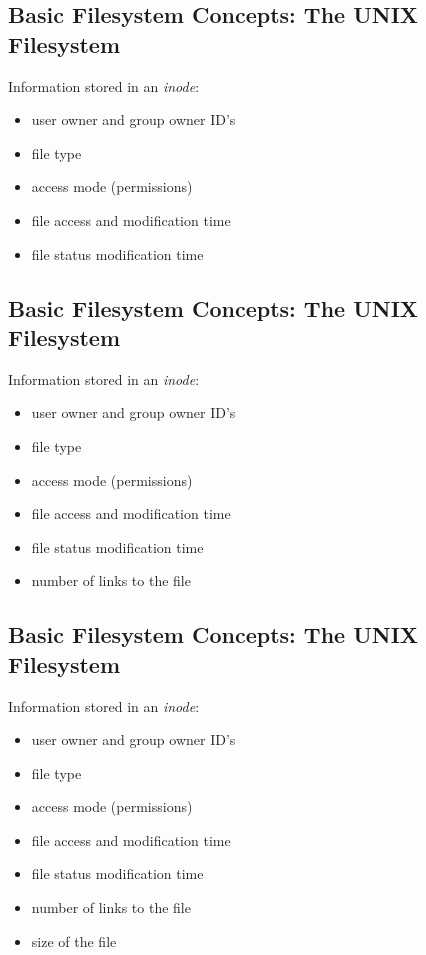 \documentclass[xga]{xdvislides}
\begin{document}
\subsection{Basic Filesystem Concepts: The UNIX Filesystem}
Information stored in an {\em inode}:
\begin{itemize}
	\item user owner and group owner ID's
	\item file type
	\item access mode (permissions)
	\item file access and modification time
	\item file status modification time
\end{itemize}

\subsection{Basic Filesystem Concepts: The UNIX Filesystem}
Information stored in an {\em inode}:
\begin{itemize}
	\item user owner and group owner ID's
	\item file type
	\item access mode (permissions)
	\item file access and modification time
	\item file status modification time
	\item number of links to the file
\end{itemize}

\subsection{Basic Filesystem Concepts: The UNIX Filesystem}
Information stored in an {\em inode}:
\begin{itemize}
	\item user owner and group owner ID's
	\item file type
	\item access mode (permissions)
	\item file access and modification time
	\item file status modification time
	\item number of links to the file
	\item size of the file
\end{itemize}
\end{document}

